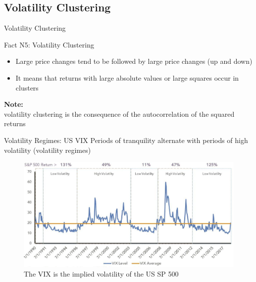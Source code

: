 \documentclass{beamer}
\begin{document}
\subsection{Volatility Clustering}
\begin{frame}{Volatility Clustering}
  \begin{exampleblock}{Fact N5: Volatility Clustering}
    \begin{itemize}
    \item Large price changes tend to be followed by large price changes (up and down)
    \item It means that returns with large absolute values or large squares occur in clusters    
    \end{itemize}    
  \end{exampleblock}
      \textbf{Note:}\\ volatility clustering is the consequence of the autocorrelation of the squared returns
\end{frame}


\begin{frame}{Volatility Regimes: US VIX}
  Periods of tranquility alternate with periods of high volatility (volatility regimes)\\

  \begin{figure}
      \centering
      \caption{The VIX is the implied volatility of the US SP 500}
      \includegraphics[width=.9\textwidth]{static/course_2_img/vix_volatility.PNG}
  \end{figure}
\end{frame}




\end{document}
